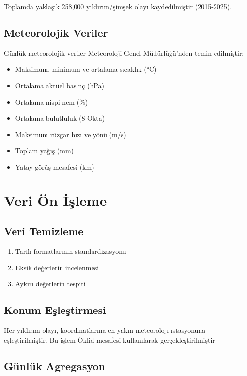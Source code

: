 Toplamda yaklaşık 258,000 yıldırım/şimşek olayı kaydedilmiştir (2015-2025).

\subsection{Meteorolojik Veriler}

Günlük meteorolojik veriler Meteoroloji Genel Müdürlüğü'nden temin edilmiştir:

\begin{itemize}
    \item Maksimum, minimum ve ortalama sıcaklık (°C)
    \item Ortalama aktüel basınç (hPa)
    \item Ortalama nispi nem (\%)
    \item Ortalama bulutluluk (8 Okta)
    \item Maksimum rüzgar hızı ve yönü (m/s)
    \item Toplam yağış (mm)
    \item Yatay görüş mesafesi (km)
\end{itemize}

\section{Veri Ön İşleme}

\subsection{Veri Temizleme}

\begin{enumerate}
    \item Tarih formatlarının standardizasyonu
    \item Eksik değerlerin incelenmesi
    \item Aykırı değerlerin tespiti
\end{enumerate}

\subsection{Konum Eşleştirmesi}

Her yıldırım olayı, koordinatlarına en yakın meteoroloji istasyonuna eşleştirilmiştir. Bu işlem Öklid mesafesi kullanılarak gerçekleştirilmiştir.

\subsection{Günlük Agregasyon}

